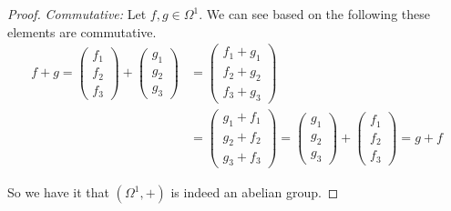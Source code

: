 \documentclass[12pt]{article}
\begin{document}
\begin{itemize}
\begin{itemize}
\begin{proof}
                \newpage
                \textit{Commutative:} Let $f,g\in \Omega^1$. We can see based on the following these elements are commutative.
                \begin{align}
                    f + g = \begin{pmatrix}f_1 \\ f_2 \\ f_3 \end{pmatrix} + \begin{pmatrix} g_1 \\ g_2 \\ g_3\end{pmatrix} &= \begin{pmatrix} f_1 + g_1 \\ f_2 +g_2 \\ f_3 + g_3 \end{pmatrix} \\
                    &=\begin{pmatrix} g_1 + f_1 \\ g_2 +f_2 \\ g_3 + f_3 \end{pmatrix} =  \begin{pmatrix} g_1 \\ g_2 \\ g_3\end{pmatrix} + \begin{pmatrix}f_1 \\ f_2 \\ f_3 \end{pmatrix} = g + f
                \end{align}

                So we have it that $(\Omega^1,+)$ is indeed an abelian group.


\end{proof}
\end{itemize}
\end{itemize}
\end{document}
